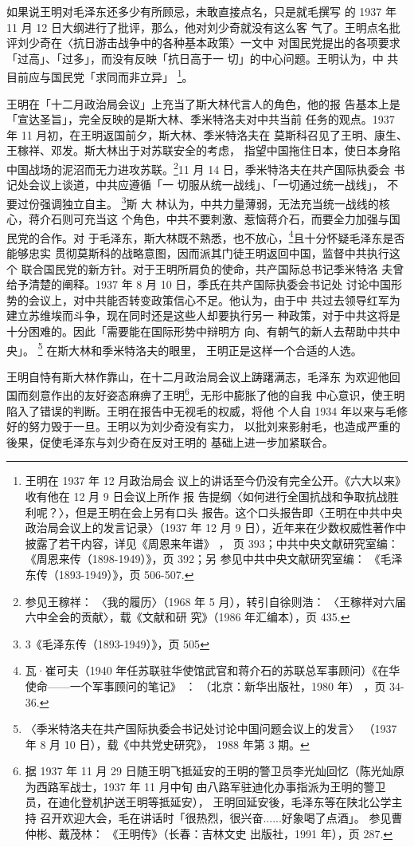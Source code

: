 如果说王明对毛泽东还多少有所顾忌，未敢直接点名，只是就毛撰写 的 1937 年
11 月 12 日大纲进行了批评，那么，他对刘少奇就没有这么客 气了。王明点名批
评刘少奇在〈抗日游击战争中的各种基本政策〉一文中 对国民党提出的各项要求
「过高」、「过多」，而没有反映「抗日高于一 切」的中心问题。王明认为，中
共目前应与国民党「求同而非立异」 \footnote{王明在 1937 年 12 月政治局会
议上的讲话至今仍没有完全公开。《六大以来》收有他在 12 月 9 日会议上所作
报 告提纲〈如何进行全国抗战和争取抗战胜利呢？〉，但是王明在会上另有口头
报告。这个口头报告即〈王明在中共中央 政治局会议上的发言记录〉（1937 年
12 月 9 日），近年来在少数权威性著作中披露了若干内容，详见《周恩来年谱》
， 页 393；中共中央文献研究室编： 《周恩来传（1898-1949）》，页 392；另
参见中共中央文献研究室编： 《毛泽东传（1893-1949）》，页 506-507.  }。

王明在「十二月政治局会议」上充当了斯大林代言人的角色，他的报 告基本上是
「宣达圣旨」，完全反映的是斯大林、季米特洛夫对中共当前 任务的观点。1937
年 11 月初，在王明返国前夕，斯大林、季米特洛夫在 莫斯科召见了王明、康生、
王稼祥、邓发。斯大林出于对苏联安全的考虑， 指望中国拖住日本，使日本身陷
中国战场的泥沼而无力进攻苏联。\footnote{参见王稼祥： 〈我的履历〉（1968
年 5 月），转引自徐则浩： 〈王稼祥对六届六中全会的贡献〉，载《文献和研
究》（1986 年汇编本），页 435.}11 月 14 日，季米特洛夫在共产国际执委会
书记处会议上谈道，中共应遵循「一 切服从统一战线」、「一切通过统一战线」，
不要过份强调独立自主。 \footnote{3《毛泽东传（1893-1949）》，页 505}斯 大
林认为，中共力量薄弱，无法充当统一战线的核心，蒋介石则可充当这
个角色，中共不要刺激、惹恼蒋介石，而要全力加强与国民党的合作。对
于毛泽东，斯大林既不熟悉，也不放心，\footnote{瓦·崔可夫（1940 年任苏联驻华使馆武官和蒋介石的苏联总军事顾问）《在华使命——一个军事顾问的笔记》
：
（北京：新华出版社，1980 年）
，页 34-36.}且十分怀疑毛泽东是否能够忠实
贯彻莫斯科的战略意图，因而派其门徒王明返回中国，监督中共执行这个
联合国民党的新方针。对于王明所肩负的使命，共产国际总书记季米特洛
夫曾给予清楚的阐释。1937 年 8 月 10 日，季氏在共产国际执委会书记处
讨论中国形势的会议上，对中共能否转变政策信心不足。他认为，由于中
共过去领导红军为建立苏维埃而斗争，现在同时还是这些人却要执行另一
种政策，对于中共这将是十分困难的。因此「需要能在国际形势中辩明方
向、有朝气的新人去帮助中共中央」。
\footnote{〈季米特洛夫在共产国际执委会书记处讨论中国问题会议上的发言〉
（1937 年 8 月 10 日），载《中共党史研究》，
1988 年第 3 期。}
在斯大林和季米特洛夫的眼里，
王明正是这样一个合适的人选。

王明自恃有斯大林作靠山，在十二月政治局会议上踌躇满志，毛泽东
为欢迎他回国而刻意作出的友好姿态麻痹了王明\footnote{据 1937 年 11 月 29 日随王明飞抵延安的王明的警卫员李光灿回忆（陈光灿原为西路军战士，1937 年 11 月中旬
由八路军驻迪化办事指派为王明的警卫员，在迪化登机护送王明等抵延安），
王明回延安後，毛泽东等在陕北公学主持
召开欢迎大会，毛在讲话时「很热烈，很兴奋......好象喝了点酒」。
参见曹仲彬、戴茂林：
《王明传》（长春：吉林文史
出版社，1991 年），页 287. }，无形中膨胀了他的自我
中心意识，使王明陷入了错误的判断。王明在报告中无视毛的权威，将他
个人自 1934 年以来与毛修好的努力毁于一旦。王明以为刘少奇没有实力，
以批刘来影射毛，也造成严重的後果，促使毛泽东与刘少奇在反对王明的
基础上进一步加紧联合。

